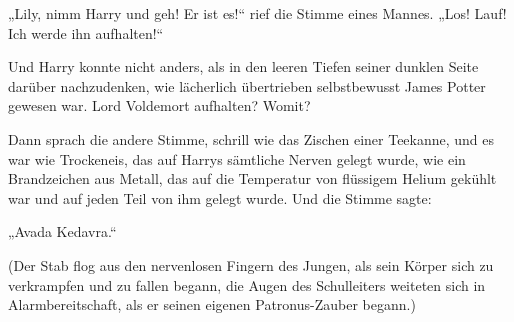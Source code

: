 \begin{em}
„Lily, nimm Harry und geh! Er ist es!“ rief die Stimme eines Mannes.
„Los! Lauf! Ich werde ihn aufhalten!“

Und Harry konnte nicht anders, als in den leeren Tiefen seiner dunklen Seite darüber nachzudenken, wie lächerlich übertrieben selbstbewusst James Potter gewesen war. Lord Voldemort aufhalten? Womit?

Dann sprach die andere Stimme, schrill wie das Zischen einer Teekanne, und es war wie Trockeneis, das auf Harrys sämtliche Nerven gelegt wurde, wie ein Brandzeichen aus Metall, das auf die Temperatur von flüssigem Helium gekühlt war und auf jeden Teil von ihm gelegt wurde. Und die Stimme sagte:

„Avada Kedavra.“
\end{em}

(Der Stab flog aus den nervenlosen Fingern des Jungen, als sein Körper sich zu verkrampfen und zu fallen begann, die Augen des Schulleiters weiteten sich in Alarmbereitschaft, als er seinen eigenen Patronus-Zauber begann.)

